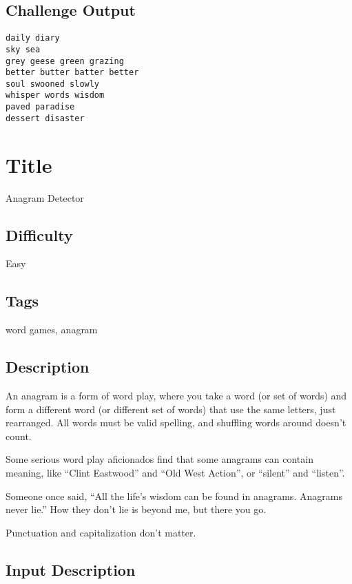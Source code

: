 \subsection{Challenge Output}\label{challenge-output-7}

\begin{verbatim}
daily diary
sky sea
grey geese green grazing
better butter batter better
soul swooned slowly
whisper words wisdom
paved paradise
dessert disaster
\end{verbatim}

\section{Title}\label{title-14}

Anagram Detector

\subsection{Difficulty}\label{difficulty-13}

Easy

\subsection{Tags}\label{tags-14}

word games, anagram

\subsection{Description}\label{description-14}

An anagram is a form of word play, where you take a word (or set of
words) and form a different word (or different set of words) that use
the same letters, just rearranged. All words must be valid spelling, and
shuffling words around doesn't count.

Some serious word play aficionados find that some anagrams can contain
meaning, like ``Clint Eastwood'' and ``Old West Action'', or ``silent''
and ``listen''.

Someone once said, ``All the life's wisdom can be found in anagrams.
Anagrams never lie.'' How they don't lie is beyond me, but there you go.

Punctuation and capitalization don't matter.

\subsection{Input Description}\label{input-description-10}

